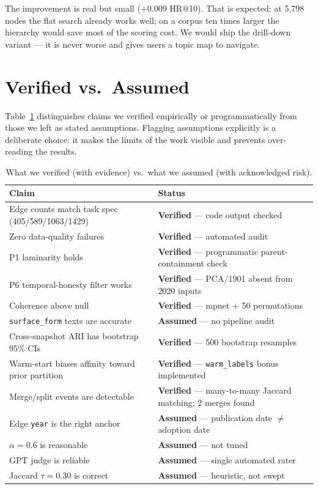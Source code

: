 \documentclass[10pt]{article}
\begin{document}
The improvement is real but small (+0.009 HR@10).
That is expected: at 5,798 nodes the flat search already works well; on a corpus
ten times larger the hierarchy would save most of the scoring cost.
We would ship the drill-down variant — it is never worse and gives users a topic
map to navigate.

\clearpage
\section{Verified vs.\ Assumed}\label{sec:verified}

Table~\ref{tab:verified} distinguishes claims we verified empirically or
programmatically from those we left as stated assumptions.
Flagging assumptions explicitly is a deliberate choice: it makes the
limits of the work visible and prevents over-reading the results.

\begin{table}[h]
\centering\small\setlength{\tabcolsep}{4pt}
\begin{tabular}{p{5cm}p{7.5cm}}
\toprule
Claim & Status \\
\midrule
Edge counts match task spec (405/589/1063/1429) & \textbf{Verified} — code output checked \\
Zero data-quality failures & \textbf{Verified} — automated audit \\
P1 laminarity holds & \textbf{Verified} — programmatic parent-containment check \\
P6 temporal-honesty filter works & \textbf{Verified} — PCA/1901 absent from 2020 inputs \\
Coherence above null & \textbf{Verified} — mpnet + 50 permutations \\
\texttt{surface\_form} texts are accurate & \textbf{Assumed} — no pipeline audit \\
Cross-snapshot ARI has bootstrap 95\% CIs & \textbf{Verified} — 500 bootstrap resamples \\
Warm-start biases affinity toward prior partition & \textbf{Verified} — \texttt{warm\_labels} bonus implemented \\
Merge/split events are detectable & \textbf{Verified} — many-to-many Jaccard matching; 2 merges found \\
Edge \texttt{year} is the right anchor & \textbf{Assumed} — publication date $\ne$ adoption date \\
$\alpha=0.6$ is reasonable & \textbf{Assumed} — not tuned \\
GPT judge is reliable & \textbf{Assumed} — single automated rater \\
Jaccard $\tau=0.30$ is correct & \textbf{Assumed} — heuristic, not swept \\
\bottomrule
\end{tabular}
\caption{What we verified (with evidence) vs.\ what we assumed (with acknowledged risk).}
\label{tab:verified}
\end{table}
\end{document}
